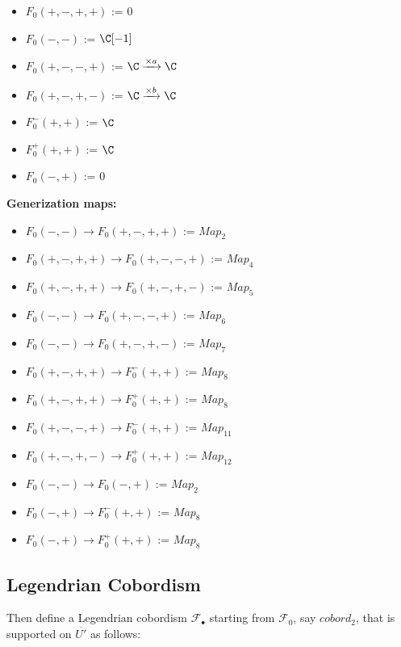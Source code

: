 \begin{itemize}
\item $F_0(+,-,+,+)$ := $0$
\item $F_0(-,-)$ := $\C[-1]$
\item $F_0(+,-,-,+)$ := $\C \xrightarrow{\times a} \C $
\item $F_0(+,-,+,-)$ := $\C \xrightarrow{\times b} \C $
\item $F_0^-(+,+)$ := $\C$
\item $F_0^+(+,+)$ := $\C$
\item $F_0(-,+)$ := $0$
\end{itemize}
\textbf{Generization maps:}

\begin{itemize}
\item $F_0(-,-)\rightarrow F_0(+,-,+,+)$ := $Map_2$
\item $F_0(+,-,+,+)\rightarrow F_0(+,-,-,+)$ := $Map_4$
\item $F_0(+,-,+,+)\rightarrow F_0(+,-,+,-)$ := $Map_5$
\item $F_0(-,-)\rightarrow F_0(+,-,-,+)$ := $Map_6$
\item $F_0(-,-)\rightarrow F_0(+,-,+,-)$ := $Map_7$
\item $F_0(+,-,+,+)\rightarrow F_0^-(+,+)$ := $Map_8$
\item $F_0(+,-,+,+)\rightarrow F_0^+(+,+)$ := $Map_8$
\item $F_0(+,-,-,+)\rightarrow F_0^-(+,+)$ := $Map_{11}$
\item $F_0(+,-,+,-)\rightarrow F_0^+(+,+)$ := $Map_{12}$
\item $F_0(-,-)\rightarrow F_0(-,+)$ := $Map_2$
\item $F_0(-,+)\rightarrow F_0^-(+,+)$ := $Map_8$
\item $F_0(-,+)\rightarrow F_0^+(+,+)$ := $Map_8$

\end{itemize}

\subsection{Legendrian Cobordism}
Then define a Legendrian cobordism $\mathscr{F}_\bullet$ starting from $\mathscr{F}_0$, say $cobord_2$, that is supported on $\overline{U'}$ as follows:\\

